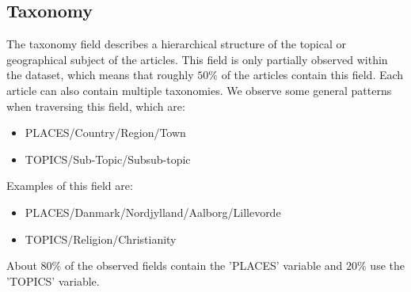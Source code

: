 \subsection{Taxonomy}
The taxonomy field describes a hierarchical structure of the topical or geographical subject of the articles.
This field is only partially observed within the dataset, which means that roughly $50\%$ of the articles contain this field.
Each article can also contain multiple taxonomies.
We observe some general patterns when traversing this field, which are:
\begin{itemize}
	\item PLACES/Country/Region/Town
	\item TOPICS/Sub-Topic/Subsub-topic
\end{itemize}
Examples of this field are:
\begin{itemize}
	\item PLACES/Danmark/Nordjylland/Aalborg/Lillevorde
	\item TOPICS/Religion/Christianity
\end{itemize}
About $80\%$ of the observed fields contain the 'PLACES' variable and $20\%$ use the 'TOPICS' variable. 
